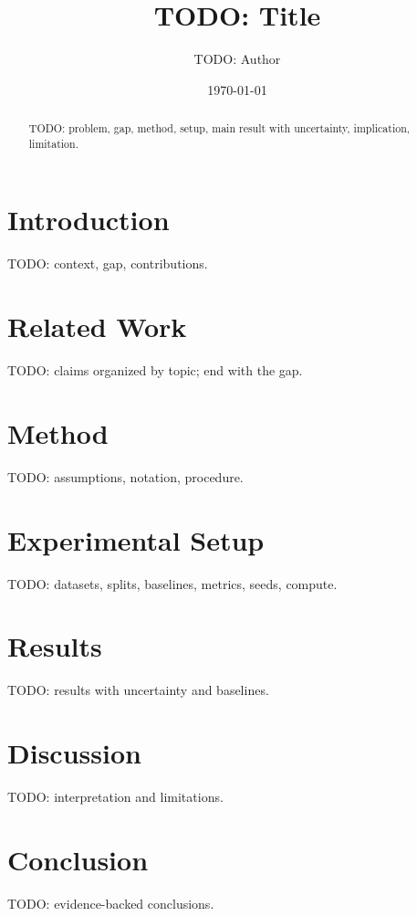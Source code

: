 \documentclass[11pt]{article}
\title{TODO: Title}
\author{TODO: Author}
\date{\today}
\begin{document}
\maketitle

\begin{abstract}
TODO: problem, gap, method, setup, main result with uncertainty, implication, limitation.
\end{abstract}

\section{Introduction}
TODO: context, gap, contributions.

\section{Related Work}
TODO: claims organized by topic; end with the gap.

\section{Method}
TODO: assumptions, notation, procedure.

\section{Experimental Setup}
TODO: datasets, splits, baselines, metrics, seeds, compute.

\section{Results}
TODO: results with uncertainty and baselines.

\section{Discussion}
TODO: interpretation and limitations.

\section{Conclusion}
TODO: evidence-backed conclusions.



\end{document}
